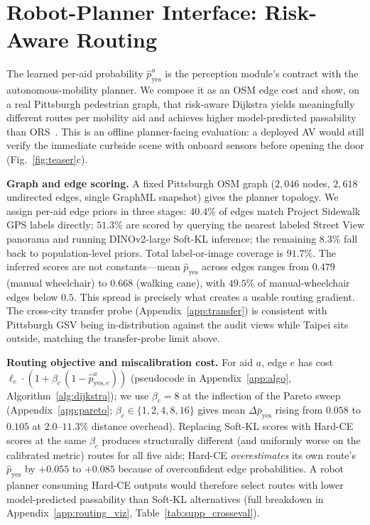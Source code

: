 \documentclass{article}
\begin{document}
\FloatBarrier
\section{Robot-Planner Interface: Risk-Aware Routing}
\label{sec:routing}

The learned per-aid probability $\hat{p}^a_\mathrm{yes}$ is the perception module's contract with the autonomous-mobility planner. We compose it as an OSM edge cost and show, on a real Pittsburgh pedestrian graph, that risk-aware Dijkstra yields meaningfully different routes per mobility aid and achieves higher model-predicted passability than ORS~\citep{openrouteservice2026wheelchair}. This is an offline planner-facing evaluation: a deployed AV would still verify the immediate curbside scene with onboard sensors before opening the door (Fig.~\ref{fig:teaser}c).

\textbf{Graph and edge scoring.} A fixed Pittsburgh OSM graph ($2{,}046$ nodes, $2{,}618$ undirected edges, single GraphML snapshot) gives the planner topology. We assign per-aid edge priors in three stages: $40.4\%$ of edges match Project Sidewalk GPS labels directly; $51.3\%$ are scored by querying the nearest labeled Street View panorama and running DINOv2-large Soft-KL inference; the remaining $8.3\%$ fall back to population-level priors. Total label-or-image coverage is \textbf{$91.7\%$}. The inferred scores are not constants---mean $\hat{p}_\mathrm{yes}$ across edges ranges from $0.479$ (manual wheelchair) to $0.668$ (walking cane), with $49.5\%$ of manual-wheelchair edges below $0.5$. This spread is precisely what creates a usable routing gradient. The cross-city transfer probe (Appendix~\ref{app:transfer}) is consistent with Pittsburgh GSV being in-distribution against the audit views while Taipei sits outside, matching the transfer-probe limit above.

\textbf{Routing objective and miscalibration cost.} For aid $a$, edge $e$ has cost $\ell_e \cdot (1 + \beta_c\,(1 - \hat{p}^a_{\mathrm{yes},e}))$  (pseudocode in Appendix~\ref{app:algo}, Algorithm~\ref{alg:dijkstra}); we use $\beta_c{=}8$ at the inflection of the Pareto sweep (Appendix~\ref{app:pareto}; $\beta_c\in\{1,2,4,8,16\}$ gives mean $\Delta\bar{p}_\mathrm{yes}$ rising from $0.058$ to $0.105$ at $2.0$--$11.3\%$ distance overhead). Replacing Soft-KL scores with Hard-CE scores at the same $\beta_c$ produces structurally different (and uniformly worse on the calibrated metric) routes for all five aids; Hard-CE \emph{overestimates} its own route's $\hat{p}_\mathrm{yes}$ by $+0.055$ to $+0.085$ because of overconfident edge probabilities. A robot planner consuming Hard-CE outputs would therefore select routes with lower model-predicted passability than Soft-KL alternatives (full breakdown in Appendix~\ref{app:routing_viz}, Table~\ref{tab:supp_crosseval}).
\end{document}
